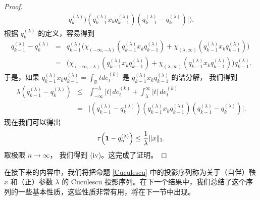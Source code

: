 \begin{proof}
\begin{eqnarray*}
q_{k}^{(\lambda)}) (q_{k-1}^{(\lambda)} x_k q_{k-1}^{(\lambda)})
(q_{k-1}^{(\lambda)} - q_{k}^{(\lambda)}) \Big| \Big).
\end{eqnarray*}
根据 $q_{k}^{(\lambda)}$ 的定义，容易得到
\begin{eqnarray*}
q_{k-1}^{(\lambda)} - q_{k}^{(\lambda)} & = & q_{k-1}^{(\lambda)}
\Big( \chi_{(-\infty, -\lambda)} (q_{k-1}^{(\lambda)} x_{k}
q_{k-1}^{(\lambda)}) + \chi_{(\lambda, \infty)}
(q_{k-1}^{(\lambda)} x_{k} q_{k-1}^{(\lambda)}) \Big) \\ & = &
\Big( \chi_{(-\infty, -\lambda)} (q_{k-1}^{(\lambda)} x_{k}
q_{k-1}^{(\lambda)}) + \chi_{(\lambda, \infty)}
(q_{k-1}^{(\lambda)} x_{k} q_{k-1}^{(\lambda)}) \Big)
q_{k-1}^{(\lambda)}.
\end{eqnarray*}
于是，如果 $q_{k-1}^{(\lambda)}
x_{k}q_{k-1}^{(\lambda)}=\int_{\mathbb R} t de_t^{(k)}$ 是 $q_{k-1}^{(\lambda)} x_{k}q_{k-1}^{(\lambda)}$ 的谱分解，
我们得到
\begin{eqnarray*}
\lambda (q_{k-1}^{(\lambda)} - q_{k}^{(\lambda)}) & \le &
\int_{-\infty}^{- \lambda} |t| \, de_t^{(k)} +
\int_{\lambda}^{\infty} |t| \, de_t^{(k)} \\ & = & \Big|
(q_{k-1}^{(\lambda)} - q_{k}^{(\lambda)}) (q_{k-1}^{(\lambda)} x_k
q_{k-1}^{(\lambda)}) (q_{k-1}^{(\lambda)} - q_{k}^{(\lambda)})
\Big|.
\end{eqnarray*}
现在我们可以得出 $$\tau \Big( {\bf 1}-q_{n}^{(\lambda)}
\Big) \le \frac{1}{\lambda} \|x\|_1.$$ 取极限 $n \to
\infty$， 我们得到 (iv)。这完成了证明。 
\end{proof}

在接下来的内容中，我们将把命题 \ref{Cuculescu} 中的投影序列称为关于（自伴）鞅 $x$ 和（正）参数 $\lambda$ 的 Cuculescu 投影序列。在下一个结果中，我们总结了这个序列的一些基本性质，这些性质非常有用，将在下一节中出现。

